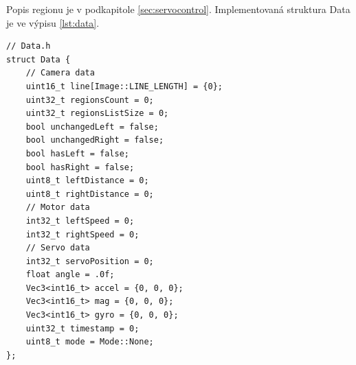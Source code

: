 Popis regionu je v podkapitole \ref{sec:servocontrol}.
Implementovaná struktura Data je ve výpisu \ref{lst:data}.
\begin{lstlisting}[caption = Struktura Data, label = lst:data]
// Data.h
struct Data {
    // Camera data
    uint16_t line[Image::LINE_LENGTH] = {0};
    uint32_t regionsCount = 0;
    uint32_t regionsListSize = 0;
    bool unchangedLeft = false;
    bool unchangedRight = false;
    bool hasLeft = false;
    bool hasRight = false;
    uint8_t leftDistance = 0;
    uint8_t rightDistance = 0;
    // Motor data
    int32_t leftSpeed = 0;
    int32_t rightSpeed = 0;
    // Servo data
    int32_t servoPosition = 0;
    float angle = .0f;
    Vec3<int16_t> accel = {0, 0, 0};
    Vec3<int16_t> mag = {0, 0, 0};
    Vec3<int16_t> gyro = {0, 0, 0};
    uint32_t timestamp = 0;
    uint8_t mode = Mode::None;
};
\end{lstlisting}

\endinput